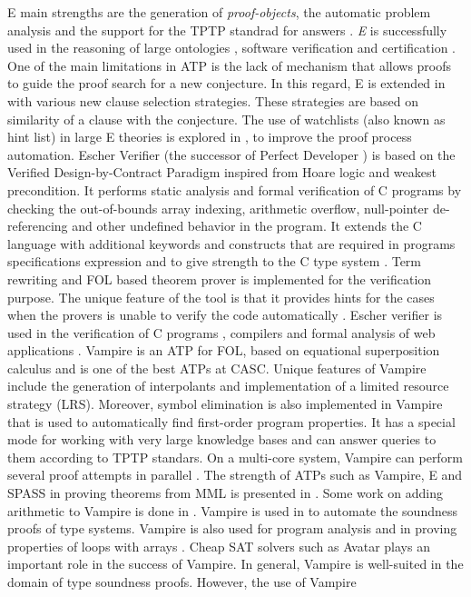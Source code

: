 E main strengths are the generation of {\em proof-objects}, the automatic problem analysis and the support for the TPTP standrad for answers .
\emph{E} is successfully used in the reasoning of large ontologies , software verification 
and certification . One of the main limitations in ATP is the lack of mechanism that allows proofs to guide the proof 
search for a new conjecture. In this regard, E is extended in  with various new clause selection strategies. These strategies
are based on similarity of a clause with the conjecture. The use of watchlists (also known as hint list) in large E 
theories is explored in , to improve the proof process automation.
Escher Verifier (the successor of Perfect Developer ) is based on the Verified Design-by-Contract Paradigm  inspired from 
Hoare logic and weakest precondition. It performs static analysis and formal verification of 
C programs by checking the out-of-bounds array indexing, arithmetic overflow, null-pointer de-referencing and other undefined behavior in the program. 
It extends the C language with additional keywords and constructs that are required in programs specifications expression and to give strength to the 
C type system . Term rewriting and FOL based theorem prover is implemented for the verification purpose. 
The unique feature of the tool is that it provides hints for the cases when the provers is unable to verify the code automatically . 
Escher verifier is used in the verification of C programs , compilers  and 
formal analysis of web applications .
Vampire  is an ATP for FOL, based on equational superposition calculus and is one of the best ATPs at CASC. 
Unique features of Vampire include the generation of interpolants and implementation of a limited resource strategy (LRS). 
Moreover, symbol elimination is also implemented in Vampire that is used to automatically find first-order program properties.
It has a special mode for working with very large knowledge bases and can answer queries to them according to TPTP standars. On a multi-core system, Vampire can perform
several proof attempts in parallel .
The strength of ATPs such as Vampire, E and SPASS in proving theorems from MML is presented in .
Some work on adding arithmetic to Vampire is done in .
Vampire is used in  to automate the soundness proofs of type systems.  
Vampire is also used for program analysis and in proving properties of loops with arrays .
Cheap SAT solvers such as Avatar  plays an important role in the success of Vampire.
In general, Vampire is well-suited in the domain of type soundness proofs. However, the use of Vampire 
